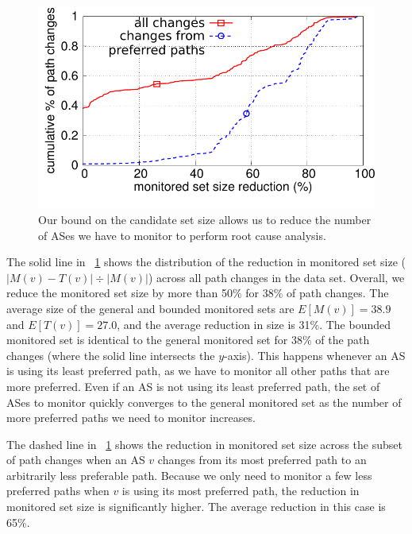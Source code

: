 \begin{figure}
\begin{center}
\includegraphics[width=1.0\columnwidth]{figs/scalability_monset_gains.pdf}
\vspace{-2em}
\caption{Our bound on the candidate set size allows us to reduce the
number of ASes we have to monitor to perform root cause analysis.}
\label{fig:setsizes}
\end{center}
\end{figure}

The solid line in \fig~\ref{fig:setsizes} shows the distribution of the
reduction in monitored set size (\ie $|M(v) - T(v)|\div|M(v)|$) across
all path changes in the data set.  Overall, we reduce the monitored set
size by more than 50\% for 38\% of path changes.  The average size of
the general and bounded monitored sets are $E[M(v)] = 38.9$ and $E[T(v)]
= 27.0$, and the average reduction in size is 31\%.  The bounded
monitored set is identical to the general monitored set for 38\% of the
path changes (where the solid line intersects the $y$-axis).  This
happens whenever an AS is using its least preferred path, as we have
to monitor all other paths that are more preferred.  Even if an AS is
not using its least preferred path, the set of ASes to monitor
quickly converges to the general monitored set as the number of more
preferred paths we need to monitor increases.  

The dashed line in \fig~\ref{fig:setsizes} shows the reduction in
monitored set size across the subset of path changes when an AS $v$
changes from its most preferred path to an arbitrarily less preferable
path.  Because we only need to monitor a few less preferred paths when
$v$ is using its most preferred path, the reduction in monitored set
size is significantly higher.  The average reduction in this case is
65\%.  

